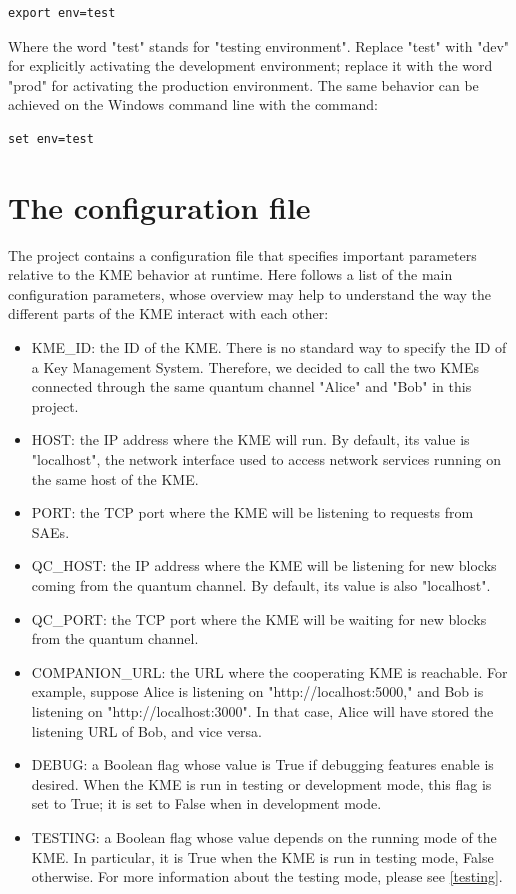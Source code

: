 \begin{verbatim}
export env=test
\end{verbatim}

Where the word "test" stands for "testing environment". Replace "test" with "dev" for explicitly activating the development environment; replace it with the word "prod" for activating the production environment. The same behavior can be achieved on the Windows command line with the command:

\begin{verbatim}
set env=test
\end{verbatim}

\section{The configuration file}
The project contains a configuration file that specifies important parameters relative to the KME behavior at runtime. Here follows a list of the main configuration parameters, whose overview may help to understand the way the different parts of the KME interact with each other:

\begin{itemize}
    \item KME\_ID: the ID of the KME. There is no standard way to specify the ID of a Key Management System. Therefore, we decided to call the two KMEs connected through the same quantum channel "Alice" and "Bob" in this project.
    \item HOST: the IP address \cite{ip} where the KME will run. By default, its value is "localhost", the network interface used to access network services running on the same host of the KME.
    \item PORT: the TCP port  \cite{tcp} where the KME will be listening to requests from SAEs.
    \item QC\_HOST: the IP address where the KME will be listening for new blocks coming from the quantum channel. By default, its value is also "localhost".
    \item QC\_PORT: the TCP port where the KME will be waiting for new blocks from the quantum channel.
    \item COMPANION\_URL: the URL where the cooperating KME is reachable. For example, suppose Alice is listening on "http://localhost:5000," and Bob is listening on "http://localhost:3000". In that case, Alice will have stored the listening URL of Bob, and vice versa.
    \item DEBUG: a Boolean flag whose value is True if debugging features enable is desired. When the KME is run in testing or development mode, this flag is set to True; it is set to False when in development mode.
    \item TESTING: a Boolean flag whose value depends on the running mode of the KME. In particular, it is True when the KME is run in testing mode, False otherwise. For more information about the testing mode, please see \ref{testing}.
\end{itemize}

